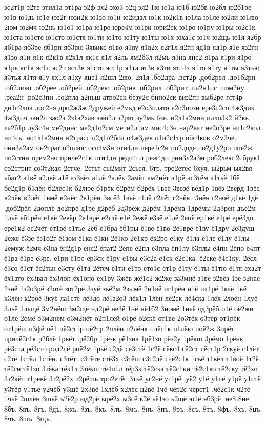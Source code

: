 {эс2т1р
э2те
этил1а
эт1ра
э2ф
эх2
эхо3
э2ц
эя2
1ю
ю1а
ю1б
ю2бв
ю2бл
ю2б1ре
ю1в
ю1дь
ю1е
юз2г
юзи2к
ю1зо
ю1и
ю2идал
ю1к
ю2к1в
ю1ла
ю1ле
ю2ли
ю1лю
2юм
ю2мч
ю2нь
ю1о1
ю1ра
ю1ре
юре4м
ю1ри
юри2ск
ю1ро
ю1ру
ю1ры
ю2с1к
ю1ста
ю1сте
ю1сто
ю1стя
ю1ти
ю1то
ю1ту
ю1ты
ю1х
юха1с
ю1ч
ю2щь
ю1я
я2бр
яб1ра
яб3ре
яб1ри
яб3рю
3явикс
я1во
я1ву
я1в2х
я2г1л
я2гн
яд1в
яд1р
я1е
яз2гн
я1зо
я1и
я1к
я2к1в
я2к1л
як1с
я1л
я2ль
ям2б3л
я2мь
я3на
янс2
я1ра
я1ри
я1ро
я1рь
яс1к
яс1л
яс2т
яст3в
я1сто
яст1р
я1та
ят3в
я3ти
яти1з
я1то
я1ту
я1ты
я3тью
я3тья
я1тя
я1у
ях1л
я1ху
яце1
я2шл
2яю.
2я1я
%
.бо2дра
.вст2р
.доб2рел
.до1б2ри
.об2люю
.об2рее
.об2рей
.об2рею
.об2рив
.об2рил
.об2рит
.па2н1ис
.пом2ну
.реа2н
.ро2с3пи
.со2пла
а2ньш
атро2ск
безу2с
бино2ск
виз2гн
выб2ре
гст4р
ди1с2лов
дос2ня
дро2ж3ж
2дружей
е2мьд
е2о3плато
е2о3пози
ере3с2со
4ж3дик
4ж3дич
заи2л
зао2з
2з1а2хав
заю2л
з2рят
зу2мь
6зь.
и2л1а2мин
илло3к2
й2кь
ла2б1р
лу3с4н
ме2динс
ме2д1о2см
мети2л1ам
мис4с3н
нар2ват
не2о3ре
ни1с2кол
ни4сь.
но4л1а2мин
н2трасс
о2д1о2бол
о4ж3дев
о1и2с1тр
ойс4ков
о2м3че.
они3л2ам
он2трат
о2плюс
осо4м3н
оти4дн
пере1с2н
по2доде
по2д1у2ро
пое2ж
по2стин
прем2но
приче2с1к
пти4дн
редо4пл
реж4ди
рни3л2а3м
роб2лею
2сбрук1
со2стрит
со3т2кал
2стче.
2стьт
сы2мит
2сься.
6тр.
тро2етес
6хуя.
ы2рьм
ыя2вя
ьбат2
а1вё
а2двё
а1ё
аз3вёз
а1лё
2алёк
2амёт
ам2нёт
а1рё
ас3тём
а1тьё
1бё
бё2д1р
б3лён
б2лёс1к
б2люё
б1рёк
б2рём
б2рёх
1веё
3везё
вёд1р
1вёз
2вёрд
1вёс
в2лёк
в2лёт
1вмё
в2нёс
2в1рён
3всё3
1вьё
г1лё
г2лёт
г2нёв
г3нён
г2ноё
д1вё
1дё
.доб2рёл
2доплё
до2прё
д1рё
д2рёб
2д3рёж
д2рём
1дрёма
1дрёмы
2д3рён
дъё2м
1дьё
еб1рён
е1вё
2евёр
2е1врё
е2глё
е1ё
2ежё
е3зё
е1лё
2епё
ер1вё
е1рё
ерё3до
ерё1к2
ес2чёт
ет1вё
е1тьё
2ёб
ё1бра
ёб1ры
ё1ве
ё1во
2ё1вре
ё1ву
ё1дру
2ё3душ
2ёже
ё3зе
ёз1о2г
ё1зом
ё1ка
ё1ки
2ё1ко
2ё1кр
ёк2ро
ё1ку
ё1ла
ё1ле
ё1лу
ё1лы
2ёмуж
ё2мч
ё3на
ён2д1р
ёнс2
ёпат2
2ёпе
ё2пл
ё3пла
ёп1лу
ё3плы
ё4пн
2ёпо
ё4пт
ё1ра
ё1ре
ё3ре.
ё1ри
ё1ро
ёр3ск
ё1ру
ё1ры
ё3с2а
ё1ск
ё2с1ка.
ё2ске
ё4с1ку.
2ёсл
ё3со
ё1ст
ёс2тан
ё3сту
ё1та
2ётеч
ё1ти
ё1то
ёто1с
ёт1р
ё1ту
ё1ты
ё1тю
ё1тя
ёха2т
ёх1ато
ёх3вал
ёх3лоп
ёх1опо
ёх1ру
3жёв
жё1с2
ж2жё
за3мнё
з1вё
з2вёз
1зё
з2наё
2знё
1з2о3рё
з2отё
зот2рё
3зуё
зъё2м
2зымё
2и1вё
иг1рён
и1ё
их1рё
1каё
1кё
к3лён
к2роё
3куё
ла1стё
лё3до
лё1з2о3
лёк1л
1лён
лё2ск
лё4ска
1лёх
2лоён
1луё
3льё
1льщё
3м2нёш
3м2щё
нд2рё
не3ё
1нё
нё1б2
3номё
1ньё
од3рёб
о1ё
оё2жи
о1лё
2омё
о3м2нём
о3м2нёт
о2п1лёй
о1рё
о2скё
от1вё
2о3тёк
о3тёр
от1рёк
от1рёш
о3фё
пё1
пё2ст1р
пё2тр
2плён
п2лёнк
плёс1к
п1лёю
поё2ж
3прёт
причё2с1к
р2блё
1рвёт
.рё2бр
1рёзк
рё1зна
1рё1зо
рёз2у
1рёкш
3рёмо
1рёнк
рё3ста
рё3сто
род2лё
роё2м
1рьё
с2дё
се3стё
1с2ё
сёкс4
сё2ст
сёст1р
2скуё
с1лёт
с2тё
1стёл
1стён.
с3тёт.
с3тёте
стё3х
с3тёш
с3т2лё
счё2с1к
1сьё
т1вёл
т1воё
1т2ё
тё2гн
тё1зо
3тёка
тёк1л
3тёкш
тё4п1л
тёр3к
тё2ска
тё2с1ки
тё2с1ко
тё2ску
тё2хо
3т2кёт
т1ревё
3т2рё2х
т2рёшь
тро2етёс
3тьё
уг2нё
уг1рё
.уё2
у1ё
у1лё
у1рё
у1стё
у3тёр
у1тьё
у2чёб
у3шё
2х3вё
1хлёб
х2лёс
ц2вё
1чё
чёр2с
чёрст1
.чё2с1к
ч2тё
1чьё
2шлён
3шьё
ъ2ё2р
ыд2рё
ырё2х
ы3сё
ь2ё
ьё1зо
ь2щё
ю1ё
яб3рё
.не8
8не.
8бъ.
8въ.
8гъ.
8дъ.
8жъ.
8зъ.
8къ.
8лъ.
8мъ.
8нъ.
8пъ.
8ръ.
8съ.
8тъ.
8фъ.
8хъ.
8цъ.
8чъ.
8шъ.
8щъ.
}
